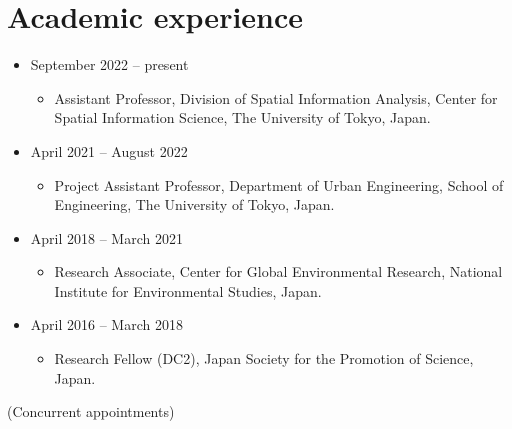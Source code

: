 \documentclass[
]{book}
\providecommand{\tightlist}{%
  \setlength{\itemsep}{0pt}\setlength{\parskip}{0pt}}
\begin{document}
\hypertarget{academic-experience}{%
\section*{Academic experience}\label{academic-experience}}

\begin{itemize}
\tightlist
\item
  September 2022 -- present

  \begin{itemize}
  \tightlist
  \item
    Assistant Professor,
    Division of Spatial Information Analysis, Center for Spatial Information Science, The University of Tokyo, Japan.
  \end{itemize}
\item
  April 2021 -- August 2022

  \begin{itemize}
  \tightlist
  \item
    Project Assistant Professor,
    Department of Urban Engineering, School of Engineering, The University of Tokyo, Japan.
  \end{itemize}
\item
  April 2018 -- March 2021

  \begin{itemize}
  \tightlist
  \item
    Research Associate,
    Center for Global Environmental Research, National Institute for Environmental Studies, Japan.
  \end{itemize}
\item
  April 2016 -- March 2018

  \begin{itemize}
  \tightlist
  \item
    Research Fellow (DC2),
    Japan Society for the Promotion of Science, Japan.
  \end{itemize}
\end{itemize}

(Concurrent appointments)
\end{document}
